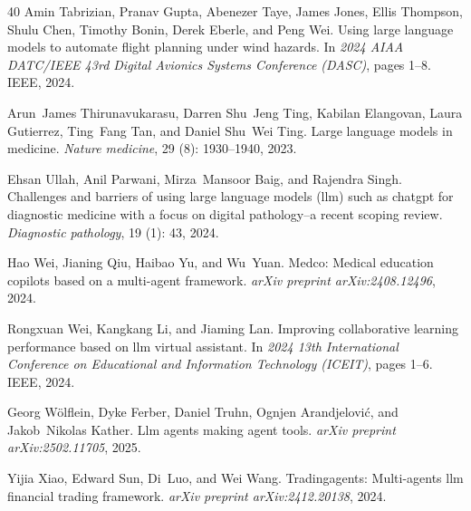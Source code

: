 \begin{thebibliography}{40}
Amin Tabrizian, Pranav Gupta, Abenezer Taye, James Jones, Ellis Thompson, Shulu Chen, Timothy Bonin, Derek Eberle, and Peng Wei.
\newblock Using large language models to automate flight planning under wind hazards.
\newblock In \emph{2024 AIAA DATC/IEEE 43rd Digital Avionics Systems Conference (DASC)}, pages 1--8. IEEE, 2024.

Arun~James Thirunavukarasu, Darren Shu~Jeng Ting, Kabilan Elangovan, Laura Gutierrez, Ting~Fang Tan, and Daniel Shu~Wei Ting.
\newblock Large language models in medicine.
\newblock \emph{Nature medicine}, 29 (8): 1930--1940, 2023.

Ehsan Ullah, Anil Parwani, Mirza~Mansoor Baig, and Rajendra Singh.
\newblock Challenges and barriers of using large language models (llm) such as chatgpt for diagnostic medicine with a focus on digital pathology--a recent scoping review.
\newblock \emph{Diagnostic pathology}, 19 (1): 43, 2024.

Hao Wei, Jianing Qiu, Haibao Yu, and Wu~Yuan.
\newblock Medco: Medical education copilots based on a multi-agent framework.
\newblock \emph{arXiv preprint arXiv:2408.12496}, 2024{}.

Rongxuan Wei, Kangkang Li, and Jiaming Lan.
\newblock Improving collaborative learning performance based on llm virtual assistant.
\newblock In \emph{2024 13th International Conference on Educational and Information Technology (ICEIT)}, pages 1--6. IEEE, 2024{}.

Georg W{\"o}lflein, Dyke Ferber, Daniel Truhn, Ognjen Arandjelovi{\'c}, and Jakob~Nikolas Kather.
\newblock Llm agents making agent tools.
\newblock \emph{arXiv preprint arXiv:2502.11705}, 2025.

Yijia Xiao, Edward Sun, Di~Luo, and Wei Wang.
\newblock Tradingagents: Multi-agents llm financial trading framework.
\newblock \emph{arXiv preprint arXiv:2412.20138}, 2024.


\end{thebibliography}
